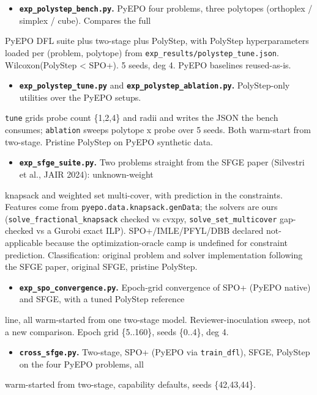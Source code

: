 \documentclass[10pt]{article}
\begin{document}
\begin{itemize}\setlength{\itemsep}{2pt}
\item \textbf{\texttt{exp\_polystep\_bench.py}.} PyEPO four problems, three polytopes (orthoplex / simplex / cube). Compares the full
\end{itemize}
  PyEPO DFL suite plus two-stage plus PolyStep, with PolyStep hyperparameters loaded per (problem, polytope) from
  \texttt{exp\_results/polystep\_tune.json}. Wilcoxon(PolyStep < SPO+). 5 seeds, deg 4. PyEPO baselines reused-as-is.

\begin{itemize}\setlength{\itemsep}{2pt}
\item \textbf{\texttt{exp\_polystep\_tune.py}} and \textbf{\texttt{exp\_polystep\_ablation.py}.} PolyStep-only utilities over the PyEPO setups.
\end{itemize}
  \texttt{tune} grids probe count \{1,2,4\} and radii and writes the JSON the bench consumes; \texttt{ablation} sweeps polytope x probe
  over 5 seeds. Both warm-start from two-stage. Pristine PolyStep on PyEPO synthetic data.

\begin{itemize}\setlength{\itemsep}{2pt}
\item \textbf{\texttt{exp\_sfge\_suite.py}.} Two problems straight from the SFGE paper (Silvestri et al., JAIR 2024): unknown-weight
\end{itemize}
  knapsack and weighted set multi-cover, with prediction in the constraints. Features come from
  \texttt{pyepo.data.knapsack.genData}; the solvers are ours (\texttt{solve\_fractional\_knapsack} checked vs cvxpy, \texttt{solve\_set\_multicover}
  gap-checked vs a Gurobi exact ILP). SPO+/IMLE/PFYL/DBB declared not-applicable because the optimization-oracle camp is
  undefined for constraint prediction. Classification: original problem and solver implementation following the SFGE
  paper, original SFGE, pristine PolyStep.

\begin{itemize}\setlength{\itemsep}{2pt}
\item \textbf{\texttt{exp\_spo\_convergence.py}.} Epoch-grid convergence of SPO+ (PyEPO native) and SFGE, with a tuned PolyStep reference
\end{itemize}
  line, all warm-started from one two-stage model. Reviewer-inoculation sweep, not a new comparison. Epoch grid
  \{5..160\}, seeds \{0..4\}, deg 4.

\begin{itemize}\setlength{\itemsep}{2pt}
\item \textbf{\texttt{cross\_sfge.py}.} Two-stage, SPO+ (PyEPO via \texttt{train\_dfl}), SFGE, PolyStep on the four PyEPO problems, all
\end{itemize}
  warm-started from two-stage, capability defaults, seeds \{42,43,44\}.
\end{document}
